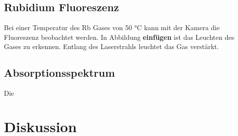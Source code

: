 \subsection{Rubidium Fluoreszenz}
Bei einer Temperatur des Rb Gases von 50 °C kann mit der Kamera die Fluoreszenz beobachtet werden.
In Abbildung \textbf{einfügen} ist das Leuchten des Gases zu erkennen.
Entlang des Laserstrahls leuchtet das Gas verstärkt.


\subsection{Absorptionsspektrum}
Die 


\section{Diskussion}


\newpage
\printbibliography


